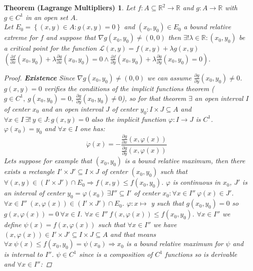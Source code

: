 \documentclass{article}
\newtheorem*{lagrangemult}{Theorem (Lagrange Multipliers)}
\begin{document}
        \begin{lagrangemult}
            Let $f:A\subseteq \mathbb{R}^2 \rightarrow \mathbb{R}$ and $g:A \rightarrow \mathbb{R}$ with $g \in C^1$ in an open set $A$. \\ 
            Let $E_0 = \left\{ (x,y)\in A: g(x,y)= 0 \right\}$ and $(x_0,y_0) \in E_0$ a bound relative extreme for $f$ and suppose that $\nabla g(x_0,y_0) \neq (0,0)$ then $\exists ! \lambda \in \mathbb{R} : (x_0,y_0)$ be a critical point for the function $\mathcal{L} (x,y) = f(x,y) + \lambda g(x,y)$ $\left( \frac{\partial f}{\partial x}(x_0,y_0) + \lambda \frac{\partial g}{\partial x}(x_0,y_0) = 0 \land \frac{\partial f}{\partial y}(x_0,y_0) + \lambda \frac{\partial g}{\partial y}(x_0,y_0) = 0\right)$.
            \begin{proof}
                \textbf{Existence} Since $\nabla g(x_0,y_0) \neq (0,0)$ we can assume $\frac{\partial g}{\partial y}(x_0,y_0) \neq 0$. $g(x,y) = 0$ verifies the conditions of the implicit functions theorem ($g \in C^1, \ g(x_0,y_0) = 0, \ \frac{\partial g}{\partial y}(x_0,y_0) \neq 0$), so for that theorem $\exists$ an open interval $I$ of center $x_0$ and an open interval $J$ of center $y_0: I \times J \subseteq A$ and $\forall x \in I \ \exists ! \ y \in J: g(x,y)=0$ also the implicit function $\varphi : I \rightarrow J$ is $C^1$. $\varphi (x_0) = y_0$ and $\forall x \in I$ one has: 
                \begin{equation*}
                    \dot{\varphi}(x) = - \frac{\frac{\partial g}{\partial x}(x, \varphi (x))}{\frac{\partial g}{\partial y}(x, \varphi (x))}
                \end{equation*} 
                Lets suppose for example that $(x_0,y_0)$ is a bound relative maximum, then there exists a rectangle $I' \times J' \subseteq I \times J$ of center $(x_0,y_0)$ such that $\forall (x,y) \in (I'\times J')\cap E_0 \Rightarrow f(x,y) \leq f(x_0,y_0)$. $\varphi$ is continuous in $x_0$, $J'$ is an interval of center $y_0 = \varphi(x_0) \ \exists  I'' \subseteq I'$ of center $x_0 : \forall x \in I'' \ \varphi(x) \in J'$. $\forall x \in I'' \ (x,\varphi(x)) \in (I' \times J') \cap E_0$. $\varphi :x \longmapsto$ y such that $g(x_0,y_0) = 0$ so $g(x,\varphi(x)) = 0 \ \forall x \in I$. $\forall x \in I'' \ f(x,\varphi(x)) \leq f(x_0,y_0)$. $\forall x \in I''$ we define $\psi(x) = f(x,\varphi(x))$ such that $\forall x \in I''$ we have $(x,\varphi(x)) \in I' \times J' \subseteq I\times J \subseteq A$ and that means $\forall x \ \psi(x) \leq f(x_0,y_0) = \psi(x_0) \Rightarrow x_0$ is a bound relative maximum for $\psi$ and is internal to $I''$. $\psi \in C^1$ since is a composition of $C^1$ functions so is derivable and $\forall x \in I''$:

\end{proof}
\end{lagrangemult}
\end{document}
